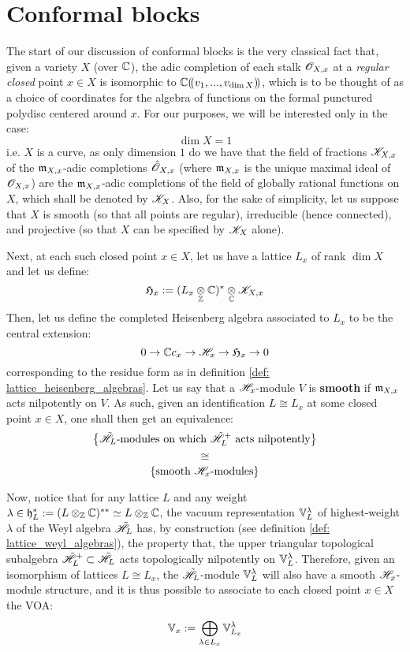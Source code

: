 \section{Conformal blocks}
    The start of our discussion of conformal blocks is the very classical fact that, given a variety $X$ (over $\mathbb{C}$), the adic completion of each stalk $\mathscr{O}_{X, x}$ at a \textit{regular closed} point $x \in X$ is isomorphic to $\mathbb{C}(\!(v_1, ..., v_{\dim X})\!)$, which is to be thought of as a choice of coordinates for the algebra of  functions on the formal punctured polydisc centered around $x$. For our purposes, we will be interested only in the case:
        $$\dim X = 1$$
    i.e. $X$ is a curve, as only dimension $1$ do we have that the field of fractions $\mathscr{K}_{X, x}$ of the $\mathfrak{m}_{X, x}$-adic completions $\hat{\mathscr{O}}_{X, x}$ (where $\mathfrak{m}_{X, x}$ is the unique maximal ideal of $\mathscr{O}_{X, x}$) are the $\mathfrak{m}_{X, x}$-adic completions of the field of globally rational functions on $X$, which shall be denoted by $\mathscr{K}_X$. Also, for the sake of simplicity, let us suppose that $X$ is smooth (so that all points are regular), irreducible (hence connected), and projective (so that $X$ can be specified by $\mathscr{K}_X$ alone).
    
    Next, at each such closed point $x \in X$, let us have a lattice $L_x$ of rank $\dim X$ and let us define:
        $$\frakH_x := (L_x \tensor_{\Z} \bbC)^* \tensor_{\bbC} \scrK_{X, x}$$
    Then, let us define the completed Heisenberg algebra associated to $L_x$ to be the central extension:
        $$0 \to \mathbb{C} c_x \to \mathscr{H}_x \to \mathfrak{H}_x \to 0$$
    corresponding to the residue form as in definition \ref{def: lattice_heisenberg_algebras}. Let us say that a $\mathscr{H}_x$-module $V$ is \textbf{smooth} if $\mathfrak{m}_{X, x}$ acts nilpotently on $V$. As such, given an identification $L \cong L_x$ at some closed point $x \in X$, one shall then get an equivalence:
        $$\left\{ \text{$\tilde{\mathscr{H}}_L$-modules on which $\tilde{\mathscr{H}}_L^+$ acts nilpotently} \right\}$$
        $$\cong$$
        $$\left\{ \text{smooth $\mathscr{H}_x$-modules} \right\}$$
    
    Now, notice that for any lattice $L$ and any weight $\lambda \in \h_L^* := (L \tensor_{\Z} \bbC)^{**} \cong L \tensor_{\Z} \bbC$, the vacuum representation $\mathbb{V}_L^{\lambda}$ of highest-weight $\lambda$ of the Weyl algebra $\tilde{\mathscr{H}}_L$ has, by construction (see definition \ref{def: lattice_weyl_algebras}), the property that, the upper triangular topological subalgebra $\tilde{\mathscr{H}}_L^+ \subset \tilde{\mathscr{H}}_L$ acts topologically nilpotently on $\mathbb{V}_L^{\lambda}$. Therefore, given an isomorphism of lattices $L \cong L_x$, the $\tilde{\mathscr{H}}_L$-module $\mathbb{V}_L^{\lambda}$ will also have a smooth $\mathscr{H}_x$-module structure, and it is thus possible to associate to each closed point $x \in X$ the VOA:
        $$\mathbb{V}_x := \bigoplus_{\lambda \in L_x} \mathbb{V}_{L_x}^{\lambda}$$

